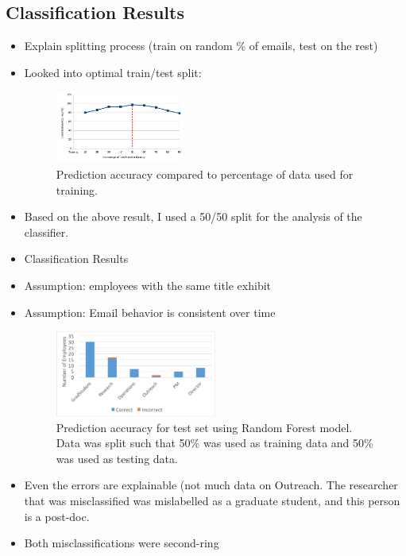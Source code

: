 \documentclass{article}
\begin{document}
\subsection{Classification Results}
\begin{itemize}

\item Explain splitting process (train on random \% of emails, test on the rest)
\item Looked into optimal train/test split:

\begin{figure}[H]
    \centering
        \includegraphics[width=0.4\textwidth]{SplitAnalysisWithLine}
        \caption{Prediction accuracy compared to percentage of data used for training.}
        \label{fig:split_analysis}
\end{figure}

\item Based on the above result, I used a 50/50 split for the analysis of the classifier.

\item Classification Results
\item Assumption: employees with the same title exhibit
\item Assumption: Email behavior is consistent over time

\begin{figure}[H]
    \centering
        \includegraphics[width=0.5\textwidth]{Prediction_50_50_RF}
        \caption{Prediction accuracy for test set using Random Forest model.  Data was split such that 50\% was used as training data and 50\% was used as testing data.}
        \label{fig:result_hist}

\end{figure}

\item Even the errors are explainable (not much data on Outreach.  The researcher that was misclassified was mislabelled as a graduate student, and this person is a post-doc.
\item Both misclassifications were second-ring 


\end{itemize}
\end{document}
